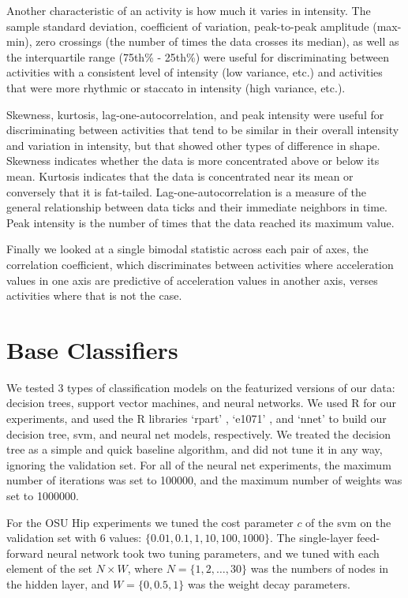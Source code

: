 \begin{table}[h]
Another characteristic of an activity is how much it varies in intensity. The sample standard
deviation, coefficient of variation, peak-to-peak amplitude (max-min), zero crossings
(the number of times the data crosses its median), as well as the
interquartile range (75th\% - 25th\%) were useful for discriminating between activities
with a consistent level of intensity (low variance, etc.) and activities that were more
rhythmic or staccato in intensity (high variance, etc.). 

Skewness, kurtosis, lag-one-autocorrelation, and peak intensity
were useful for discriminating between
activities that tend to be similar in their overall intensity and variation in intensity,
but that showed other types of difference in shape. Skewness indicates whether the data is
more concentrated above or below its mean. Kurtosis indicates that the data is concentrated
near its mean or conversely that it is fat-tailed. Lag-one-autocorrelation is a measure of
the general relationship between data ticks and their immediate neighbors in time. Peak
intensity is the number of times that the data reached its maximum value. 

Finally we looked at a single bimodal statistic across each pair of axes, the correlation
coefficient, which discriminates between activities where acceleration values in one axis
are predictive of acceleration values in another axis, verses activities where that is not the case.

\section{Base Classifiers}

We tested 3 types of classification models on the featurized versions of our data:
decision trees, support vector machines, and neural networks. We used R for our
experiments, and used the R libraries `rpart' \cite{rpart}, `e1071' \cite{svm},
and `nnet' \cite{nnet} to build
our decision tree, svm, and neural net models, respectively. We treated the
decision tree as a simple and quick baseline algorithm, and did not tune it in
any way, ignoring the validation set. For all of the neural net experiments,
the maximum number of iterations was set to 100000, and the maximum number of
weights was set to 1000000.

For the OSU Hip experiments we tuned the
cost parameter $c$ of the svm on the validation set with 6 values:
$\{0.01,0.1,1,10,100,1000\}$. The single-layer feed-forward neural network took
two tuning parameters, and we tuned with each element of the set $N \times W$,
where $N = \{1,2, \ldots, 30\}$ was the numbers of nodes in the hidden layer, and 
$W = \{0,0.5,1\}$ was the weight decay parameters.


\end{table}
